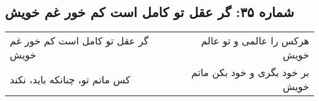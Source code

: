 \begin{center}
\section*{شماره ۳۵: گر عقل تو کامل است کم خور غم خویش}
\label{sec:035}
\begin{longtable}{l p{0.5cm} r}
گر عقل تو کامل است کم خور غم خویش
&&
هرکس را عالمی و تو عالم خویش
\\
کس ماتم تو، چنانکه باید، نکند
&&
بر خود بگری و خود بکن ماتم خویش
\\
\end{longtable}
\end{center}
